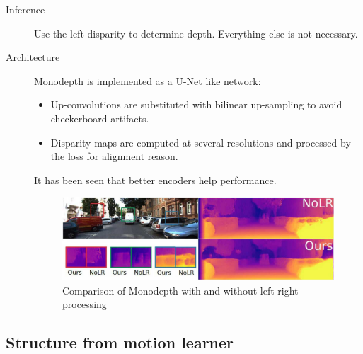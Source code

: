 \begin{description}
\begin{description}
            \item[Inference]
                Use the left disparity to determine depth. Everything else is not necessary.

            \item[Architecture]
                Monodepth is implemented as a U-Net like network:
                \begin{itemize}
                    \item Up-convolutions are substituted with bilinear up-sampling to avoid checkerboard artifacts.
                    \item Disparity maps are computed at several resolutions and processed by the loss for alignment reason.
                \end{itemize}

                \begin{remark}
                    It has been seen that better encoders help performance.
                \end{remark}

            \begin{figure}[H]
                \centering
                \includegraphics[width=0.7\linewidth]{./img/monodepth_lr_results.jpg}
                \caption{Comparison of Monodepth with and without left-right processing}
            \end{figure}
        \end{description}
    \end{description}


\subsection{Structure from motion learner}

